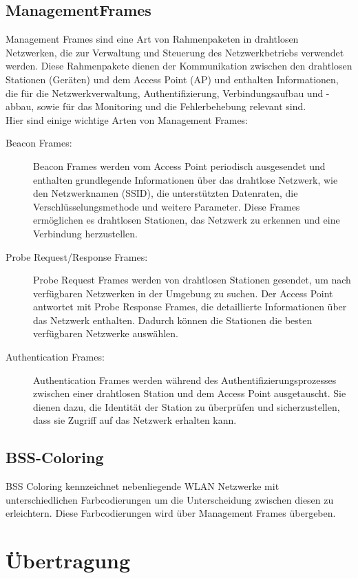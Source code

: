\documentclass[12pt,a4paper]{article}
\begin{document}
	\subsection{ManagementFrames}
		Management Frames sind eine Art von Rahmenpaketen in drahtlosen Netzwerken, die zur Verwaltung und Steuerung des Netzwerkbetriebs verwendet werden. Diese Rahmenpakete dienen der Kommunikation zwischen den drahtlosen Stationen (Geräten) und dem Access Point (AP) und enthalten Informationen, die für die Netzwerkverwaltung, Authentifizierung, Verbindungsaufbau und -abbau, sowie für das Monitoring und die Fehlerbehebung relevant sind.\\
		Hier sind einige wichtige Arten von Management Frames:
		\begin{description}
			\item[Beacon Frames:] Beacon Frames werden vom Access Point periodisch ausgesendet und enthalten grundlegende Informationen über das drahtlose Netzwerk, wie den Netzwerknamen (SSID), die unterstützten Datenraten, die Verschlüsselungsmethode und weitere Parameter. 
			Diese Frames ermöglichen es drahtlosen Stationen, das Netzwerk zu erkennen und eine Verbindung herzustellen.
			\item[Probe Request/Response Frames:] Probe Request Frames werden von drahtlosen Stationen gesendet, um nach verfügbaren Netzwerken in der Umgebung zu suchen. Der Access Point antwortet mit Probe Response Frames, die detaillierte Informationen über das Netzwerk enthalten. Dadurch können die Stationen die besten verfügbaren Netzwerke auswählen.
			\item[Authentication Frames:] Authentication Frames werden während des Authentifizierungsprozesses zwischen einer drahtlosen Station und dem Access Point ausgetauscht. Sie dienen dazu, die Identität der Station zu überprüfen und sicherzustellen, dass sie Zugriff auf das Netzwerk erhalten kann.
		\end{description}

	\subsection{BSS-Coloring}
	BSS Coloring kennzeichnet nebenliegende WLAN Netzwerke mit unterschiedlichen Farbcodierungen um die Unterscheidung zwischen diesen zu erleichtern. Diese Farbcodierungen wird über Management Frames übergeben.

\section{Übertragung}		
\end{document}
